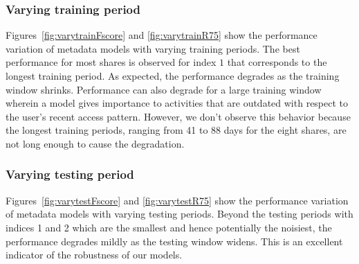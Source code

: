 \subsubsection{Varying training period}
Figures~\ref{fig:varytrainFscore} and \ref{fig:varytrainR75} show the
performance variation of metadata models with varying training
periods.  The best performance for most shares is observed for index
$1$ that corresponds to the longest training period.  As expected, the
performance degrades as the training window shrinks.  Performance can
also degrade for a large training window wherein a model gives
importance to activities that are outdated with respect to the user's
recent access pattern.  However, we don't observe this behavior
because the longest training periods, ranging from 41 to 88 days for
the eight shares, are not long enough to cause the degradation.

\subsubsection{Varying testing period}
Figures~\ref{fig:varytestFscore} and \ref{fig:varytestR75} show the
performance variation of metadata models with varying testing periods.
Beyond the testing periods with indices 1 and 2 which are the smallest
and hence potentially the noisiest, the performance degrades mildly as
the testing window widens.  This is an excellent indicator of the
robustness of our models.



